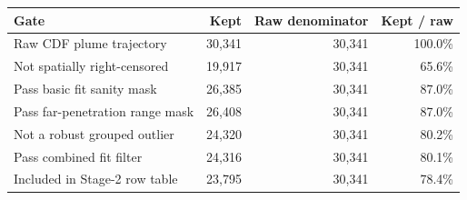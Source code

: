 \begin{tabular}{lrrr}
\toprule
Gate & Kept & Raw denominator & Kept / raw \\
\midrule
Raw CDF plume trajectory & 30,341 & 30,341 & 100.0\% \\
Not spatially right-censored & 19,917 & 30,341 & 65.6\% \\
Pass basic fit sanity mask & 26,385 & 30,341 & 87.0\% \\
Pass far-penetration range mask & 26,408 & 30,341 & 87.0\% \\
Not a robust grouped outlier & 24,320 & 30,341 & 80.2\% \\
Pass combined fit filter & 24,316 & 30,341 & 80.1\% \\
Included in Stage-2 row table & 23,795 & 30,341 & 78.4\% \\
\bottomrule
\end{tabular}
